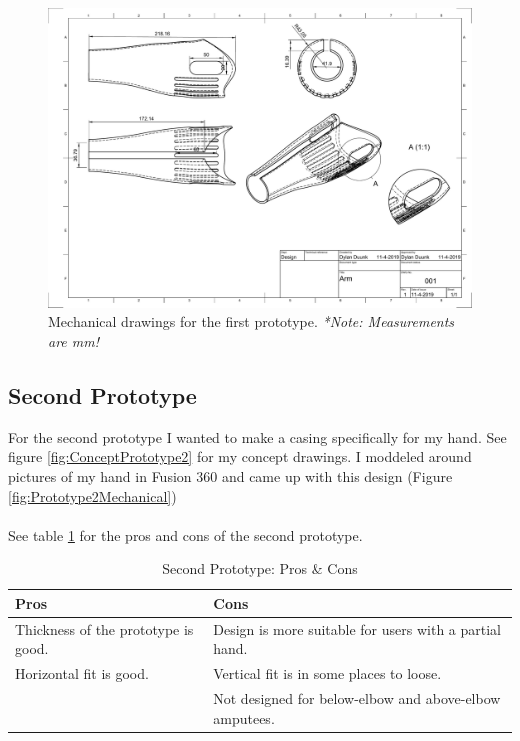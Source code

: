 \documentclass[11pt, a4paper]{article}
\begin{document}
\newpage

\begin{landscape}
    \thispagestyle{empty}
    \begin{figure}[h]
        \centering
        \includegraphics[scale=0.5]{Arm_Drawing_v3.pdf}
        \caption{Mechanical drawings for the first prototype. \textit{*Note: Measurements are mm!}}
        \label{fig:Prototype1Mechanical}
    \end{figure} 
\end{landscape}

\subsection{Second Prototype}
For the second prototype I wanted to make a casing specifically for my hand.
See figure \ref{fig:ConceptPrototype2} for my concept drawings. 
I moddeled around pictures of my hand in Fusion 360 and came up with this design (Figure \ref{fig:Prototype2Mechanical})
\\ \\
See table \ref{tab:SecondPrototypeProsCons} for the pros and cons of the second prototype.
\begin{table}[ht]
    \centering
    \begin{tabular}[t]{p{6cm} p{6cm}}
    \toprule
    \textbf{Pros} & \textbf{Cons} \\
    \midrule
    Thickness of the prototype is good. & Design is more suitable for users with a partial hand. \\
    Horizontal fit is good. & Vertical fit is in some places to loose. \\
    & Not designed for below-elbow and above-elbow amputees. \\ 
    \bottomrule
    \end{tabular}
    \caption{Second Prototype: Pros \& Cons}
    \label{tab:SecondPrototypeProsCons}
\end{table}
\end{document}
